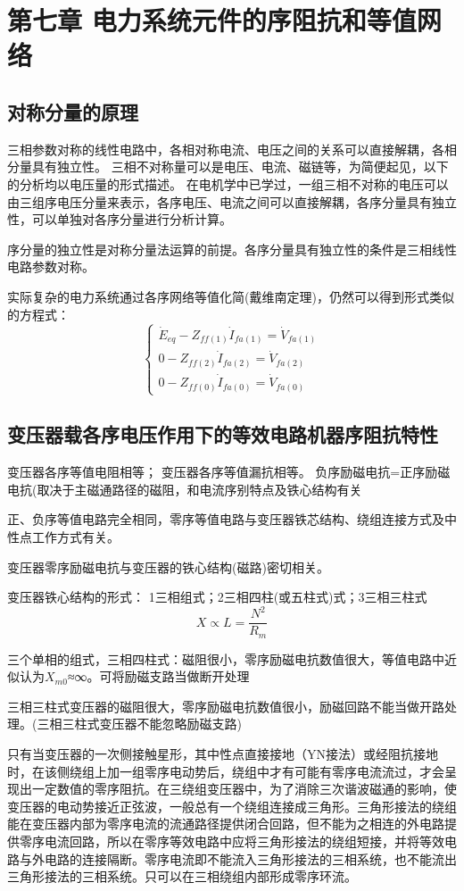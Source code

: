 \documentclass[UTF8, 12pt, a4paper]{ctexart}
\begin{document}
\section{第七章{} 电力系统元件的序阻抗和等值网络}
\subsection{对称分量的原理}
三相参数对称的线性电路中，各相对称电流、电压之间的关系可以直接解耦，各相分量具有独立性。
三相不对称量可以是电压、电流、磁链等，为简便起见，以下的分析均以电压量的形式描述。
在电机学中已学过，一组三相不对称的电压可以由三组序电压分量来表示，各序电压、电流之间可以直接解耦，各序分量具有独立性，可以单独对各序分量进行分析计算。

序分量的独立性是对称分量法运算的前提。各序分量具有独立性的条件是三相线性电路参数对称。

实际复杂的电力系统通过各序网络等值化简(戴维南定理)，仍然可以得到形式类似的方程式：
\[
    \begin{cases}
        \dot{E}_{eq}-Z_{ff(1)}\dot{I}_{fa(1)}=\dot{V}_{fa(1)}\\
        0-Z_{ff(2)}\dot{I}_{fa(2)}=\dot{V}_{fa(2)}\\
        0-Z_{ff(0)}\dot{I}_{fa(0)}=\dot{V}_{fa(0)}
    \end{cases}
\]
\subsection{变压器载各序电压作用下的等效电路机器序阻抗特性}
变压器各序等值电阻相等；
变压器各序等值漏抗相等。
负序励磁电抗=正序励磁电抗(取决于主磁通路径的磁阻，和电流序别特点及铁心结构有关

正、负序等值电路完全相同，零序等值电路与变压器铁芯结构、绕组连接方式及中性点工作方式有关。

变压器零序励磁电抗与变压器的铁心结构(磁路)密切相关。

变压器铁心结构的形式： 1三相组式；2三相四柱(或五柱式)式；3三相三柱式
\[X \propto L = \frac { N ^ { 2 } } { R _ { m } }\]

三个单相的组式，三相四柱式：磁阻很小，零序励磁电抗数值很大，等值电路中近似认为$X_{m0}$≈∞。可将励磁支路当做断开处理

三相三柱式变压器的磁阻很大，零序励磁电抗数值很小，励磁回路不能当做开路处理。(三相三柱式变压器不能忽略励磁支路)

只有当变压器的一次侧接触星形，其中性点直接接地（YN接法）或经阻抗接地时，在该侧绕组上加一组零序电动势后，绕组中才有可能有零序电流流过，才会呈现出一定数值的零序阻抗。在三绕组变压器中，为了消除三次谐波磁通的影响，使变压器的电动势接近正弦波，一般总有一个绕组连接成三角形。三角形接法的绕组能在变压器内部为零序电流的流通路径提供闭合回路，但不能为之相连的外电路提供零序电流回路，所以在零序等效电路中应将三角形接法的绕组短接，并将等效电路与外电路的连接隔断。零序电流即不能流入三角形接法的三相系统，也不能流出三角形接法的三相系统。只可以在三相绕组内部形成零序环流。
\end{document}
